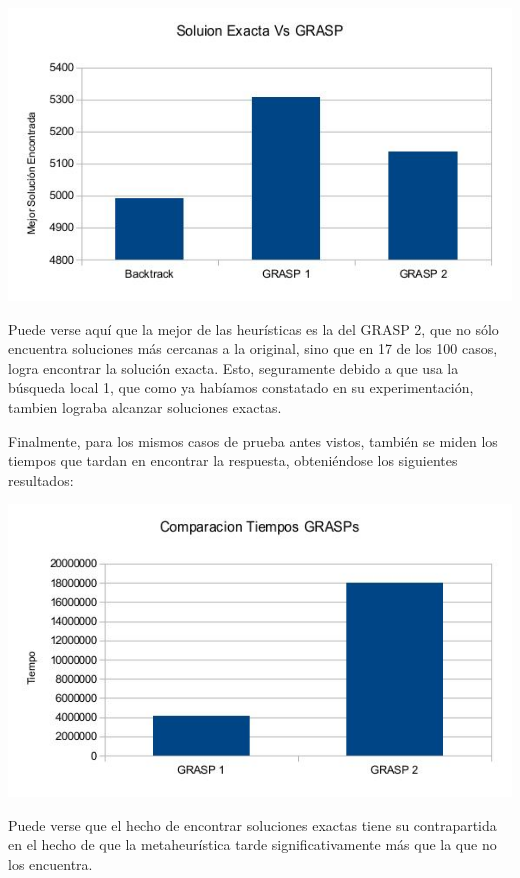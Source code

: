 \includegraphics[scale=0.5]{Ej5/graspSol.jpg}

Puede verse aquí que la mejor de las heurísticas es la del GRASP 2, que no sólo encuentra soluciones más cercanas a la original, sino que en 17 de los 100 casos, logra encontrar la solución exacta. Esto, seguramente debido a que usa la búsqueda local 1, que como ya habíamos constatado en su experimentación, tambien lograba alcanzar soluciones exactas.

Finalmente, para los mismos casos de prueba antes vistos, también se miden los tiempos que tardan en encontrar la respuesta, obteniéndose los siguientes resultados:

\includegraphics[scale=0.5]{Ej5/tiempos.jpg}

Puede verse que el hecho de encontrar soluciones exactas tiene su contrapartida en el hecho de que la metaheurística tarde significativamente más que la que no los encuentra.